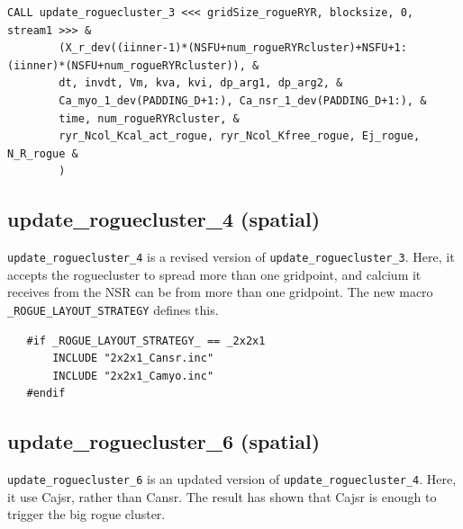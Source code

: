 {\small
\begin{verbatim}
CALL update_roguecluster_3 <<< gridSize_rogueRYR, blocksize, 0, stream1 >>> &
        (X_r_dev((iinner-1)*(NSFU+num_rogueRYRcluster)+NSFU+1:(iinner)*(NSFU+num_rogueRYRcluster)), &                                                                                                             
        dt, invdt, Vm, kva, kvi, dp_arg1, dp_arg2, &                                                                                                                                                              
        Ca_myo_1_dev(PADDING_D+1:), Ca_nsr_1_dev(PADDING_D+1:), &                                                                                                                                                 
        time, num_rogueRYRcluster, &                                                                                                                                                                              
        ryr_Ncol_Kcal_act_rogue, ryr_Ncol_Kfree_rogue, Ej_rogue, N_R_rogue &                                                                                                                                      
        )               
\end{verbatim}}

\subsection{update\_roguecluster\_4 (spatial)}

\verb!update_roguecluster_4! is a revised version of
\verb!update_roguecluster_3!. Here, it accepts the roguecluster to spread more
than one gridpoint, and calcium it receives from the NSR can be from more than
one gridpoint. The new macro \verb!_ROGUE_LAYOUT_STRATEGY! defines this.

\begin{verbatim}
   #if _ROGUE_LAYOUT_STRATEGY_ == _2x2x1
       INCLUDE "2x2x1_Cansr.inc"
       INCLUDE "2x2x1_Camyo.inc"
   #endif    
\end{verbatim}

\subsection{update\_roguecluster\_6 (spatial)}
\label{sec:update_roguecluster_6}

\verb!update_roguecluster_6! is an updated version of
\verb!update_roguecluster_4!. Here, it use Cajsr, rather than Cansr. The result
has shown that Cajsr is enough to trigger the big rogue cluster. 

